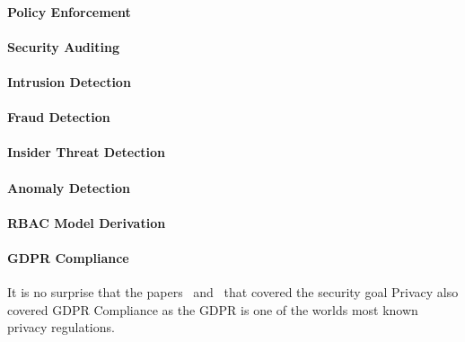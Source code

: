 \documentclass[runningheads]{llncs}
\begin{document}
\paragraph{Policy Enforcement}
\paragraph{Security Auditing}
\paragraph{Intrusion Detection}
\paragraph{Fraud Detection}
\paragraph{Insider Threat Detection}
\paragraph{Anomaly Detection}
\paragraph{RBAC Model Derivation}
\paragraph{GDPR Compliance} It is no surprise that the papers~\cite{Zaman20192982} and~\cite{MozafariMehr202182} that covered the security goal Privacy also covered GDPR Compliance as the GDPR is one of the worlds most known privacy regulations.
\end{document}
